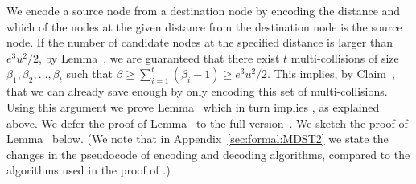  We encode a source node from a destination node by encoding the distance and which of the nodes at the given distance from the destination node is the source node. If the number of candidate nodes at the specified distance is larger than $e^3u^2/2$, by Lemma~, we are guaranteed that there exist $t$ multi-collisions of size $\beta_1,\beta_2,\ldots,\beta_t$ such that $\beta \ge \sum_{i=1}^t (\beta_i-1)\geq e^3u^2/2$. This implies,  by Claim~, that we can already save enough by only encoding this set of multi-collisions.
Using this argument we prove Lemma~ which in turn implies , as explained above. 
\ifnum{}
We defer the proof of Lemma~ to the full version~\cite{full}.
\else 
We sketch the proof of Lemma~ below. (We note that in 
Appendix~\ref{sec:formal:MDST2} 
we state the changes in the pseudocode of encoding and decoding algorithms, compared to the algorithms used in the proof of .)

